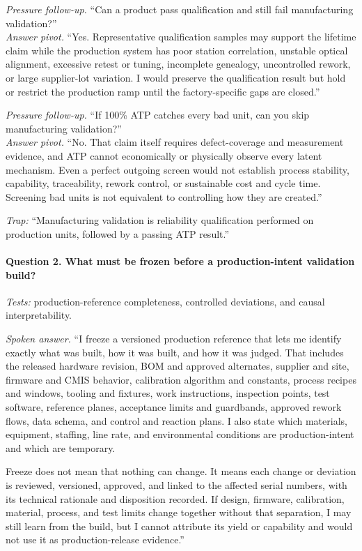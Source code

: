 \textit{Pressure follow-up.} ``Can a product pass qualification and still fail
manufacturing validation?''\\
\textit{Answer pivot.} ``Yes. Representative qualification samples may support
the lifetime claim while the production system has poor station correlation,
unstable optical alignment, excessive retest or tuning, incomplete genealogy,
uncontrolled rework, or large supplier-lot variation. I would preserve the
qualification result but hold or restrict the production ramp until the
factory-specific gaps are closed.''

\textit{Pressure follow-up.} ``If 100\% ATP catches every bad unit, can you skip
manufacturing validation?''\\
\textit{Answer pivot.} ``No. That claim itself requires defect-coverage and
measurement evidence, and ATP cannot economically or physically observe every
latent mechanism. Even a perfect outgoing screen would not establish process
stability, capability, traceability, rework control, or sustainable cost and
cycle time. Screening bad units is not equivalent to controlling how they are
created.''

\textit{Trap:} ``Manufacturing validation is reliability qualification
performed on production units, followed by a passing ATP result.''

\paragraph{Question 2. What must be frozen before a production-intent validation
build?}
\textit{Tests:} production-reference completeness, controlled deviations, and
causal interpretability.

\textit{Spoken answer.}
``I freeze a versioned production reference that lets me identify exactly what
was built, how it was built, and how it was judged. That includes the released
hardware revision, BOM and approved alternates, supplier and site, firmware and
CMIS behavior, calibration algorithm and constants, process recipes and
windows, tooling and fixtures, work instructions, inspection points, test
software, reference planes, acceptance limits and guardbands, approved rework
flows, data schema, and control and reaction plans. I also state which
materials, equipment, staffing, line rate, and environmental conditions are
production-intent and which are temporary.

Freeze does not mean that nothing can change. It means each change or deviation
is reviewed, versioned, approved, and linked to the affected serial numbers,
with its technical rationale and disposition recorded. If design, firmware,
calibration, material, process, and test limits change together without that
separation, I may still learn from the build, but I cannot attribute its yield
or capability and would not use it as production-release evidence.''


